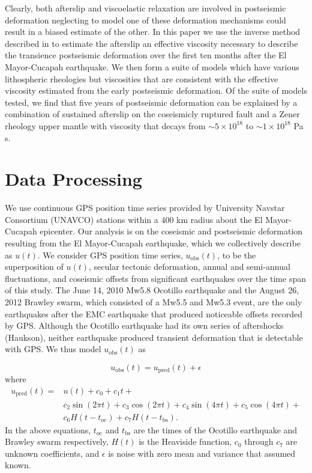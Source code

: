 \documentclass[12pt]{article}
\begin{document}
Clearly, both afterslip and viscoelastic relaxation are involved in postseismic deformation neglecting to model one of these deformation mechanisms could result in a biased estimate of the other.  In this paper we use the inverse method described in \citet{Hines2015} to estimate the afterslip an effective viscosity necessary to describe the transience postseismic deformation over the first ten months after the El Mayor-Cucapah earthquake. We then form a suite of models which have various lithospheric rheologies but viscosities that are consistent with the effective viscosity estimated from the early postseismic deformation. Of the suite of models tested, we find that five years of postseismic deformation can be explained by a combination of sustained afterslip on the coseismicly ruptured fault and a Zener rheology upper mantle with viscosity that decays from $\sim5\times10^{18}$ to $\sim1\times10^{18}$ Pa s. 


\section*{Data Processing}

We use continuous GPS position time series provided by University Navstar Consortium (UNAVCO) stations within a 400 km radius about the El Mayor-Cucapah epicenter. Our analysis is on the coseismic and postseismic deformation resulting from the El Mayor-Cucapah earthquake, which we collectively describe as $u(t)$. We consider GPS position time series, $u_\mathrm{obs}(t)$, to be the superposition of $u(t)$, secular tectonic deformation, annual and semi-annual fluctuations, and coseismic offsets from significant earthquakes over the time span of this study.  The June 14, 2010 Mw5.8 Ocotillo earthquake and the August 26, 2012 Brawley swarm, which consisted of a Mw5.5 and Mw5.3 event, are the only earthquakes after the EMC earthquake that produced noticeable offsets recorded by GPS. Although the Ocotillo earthquake had its own series of aftershocks (Haukson), neither earthquake produced transient deformation that is detectable with GPS. We thus model $u_\mathrm{obs}(t)$ as 

\begin{equation}
  u_\mathrm{obs}(t) = u_\mathrm{pred}(t) + \epsilon
\end{equation}
where
\begin{equation}\label{TimeSeriesModel}
  \begin{split}  
    u_\mathrm{pred}(t) = &u(t) + c_0 + c_1t + \\
                         &c_2\sin(2\pi t) + c_3\cos(2\pi t) + c_4\sin(4\pi t) + c_5\cos(4\pi t) + \\
                         &c_6H(t-t_\mathrm{oc}) + c_7H(t-t_\mathrm{bs}).
  \end{split}
\end{equation}
In the above equations, $t_\mathrm{oc}$ and $t_\mathrm{bs}$ are the times of the Ocotillo earthquake and Brawley swarm respectively, $H(t)$ is the Heaviside function, $c_0$ through $c_7$ are unknown coefficients, and $\epsilon$ is noise with zero mean and variance that assumed known.
\end{document}
